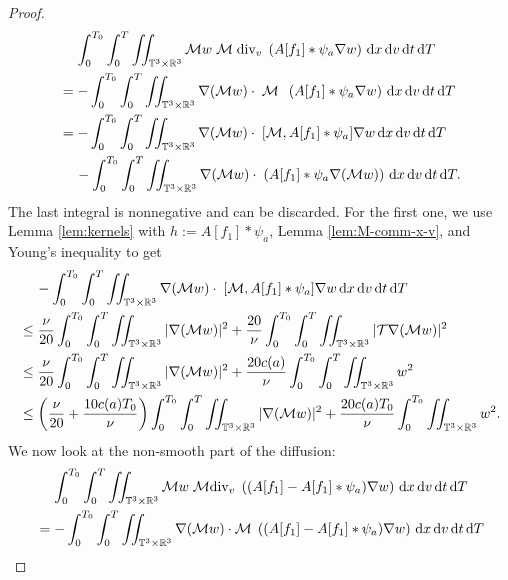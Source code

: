 \documentclass[11pt,american, reqno]{amsart}
\numberwithin{equation}{section}
\newcommand{\R}{\mathbb R}
\newcommand{\1}{\mathds{1}}
\newcommand{\dt}{\, {\rm d} t}
\newcommand{\dT}{\, {\rm d} T}
\newcommand{\dv}{\, {\rm d} v}
\newcommand{\dx}{\, {\rm d} x}
\newcommand{\T}{\mathbb{T}}
\numberwithin{equation}{section}
\begin{document}
\begin{proof}
\begin{align*}
& \quad \,
\int_0^{T_0}\int_0^{T} \iint_{\T^3 \times \R^3} \mathcal{M} w \; \mathcal{M} \; \textrm{div}_v \;\left( A[f_1]\ast \psi_a \nabla w \right)\dx\dv\dt\dT 
\\
&= -\int_0^{T_0}\int_0^{T} \iint_{\T^3 \times \R^3}  \nabla(\mathcal{M} w) \cdot  \; \mathcal{M} \; \;\left( A[f_1]\ast \psi_a \nabla w \right) \dx\dv\dt\dT 
\\
&= -\int_0^{T_0}\int_0^{T} \iint_{\T^3 \times \R^3}  \nabla(\mathcal{M} w) \cdot  \; [\mathcal{M}, A[f_1]\ast \psi_a] \nabla w \dx\dv\dt\dT
\\
& \quad \,
 -\int_0^{T_0}\int_0^{T} \iint_{\T^3 \times \R^3}  \nabla(\mathcal{M} w) \cdot  \; \left( A[f_1]\ast \psi_a \nabla (\mathcal{M}w) \right) \dx\dv\dt\dT.
\end{align*}
The last integral is nonnegative and can be discarded. For the first one, we use  Lemma \ref{lem:kernels} with $h:= A[f_1]\ast \psi_a$, Lemma \ref{lem:M-comm-x-v}, and Young's inequality to get 
\begin{align*}
& \quad \,
-\int_0^{T_0}\int_0^{T} \iint_{\T^3 \times \R^3}  \nabla(\mathcal{M} w) \cdot  \; [\mathcal{M}, A[f_1]\ast \psi_a] \nabla w \dx\dv\dt\dT 
\\
& \leq 
\frac{\nu}{20}\int_0^{T_0}\int_0^{T} \iint_{\T^3 \times \R^3}  |\nabla(\mathcal{M} w)|^2 %
+ \frac{20}{\nu}\int_0^{T_0}\int_0^{T} \iint_{\T^3 \times \R^3} |\mathcal{T} \nabla  (\mathcal{M}w )|^2 
\\
& \leq 
\frac{\nu}{20}\int_0^{T_0}\int_0^{T} \iint_{\T^3 \times \R^3}  
|\nabla(\mathcal{M} w)|^2 %
+ \frac{20 c(a) }{\nu}\int_0^{T_0}\int_0^{T} \iint_{\T^3 \times \R^3} w^2 
\\
&\le \left( \frac{\nu}{20} +  \frac{10 c(a)T_0 }{\nu}\right)  \int_0^{T_0}\int_0^{T} \iint_{\T^3 \times \R^3}  
|\nabla(\mathcal{M} w)|^2 %
+ \frac{20 c(a) T_0}{\nu}\int_0^{T_0}\iint_{\T^3 \times \R^3} 
w^2.
\end{align*}
We now look at the non-smooth part of the diffusion: 
\begin{align*}
& \quad \,
\int_0^{T_0}\int_0^{T} \iint_{\T^3 \times \R^3} 
\mathcal{M} w \; \mathcal{M}\textrm{div}_v \;\left( (A[f_1]-A[f_1]\ast \psi_a) \nabla w \right)\dx\dv\dt\dT
\\
&= - \int_0^{T_0}\int_0^{T} \iint_{\T^3 \times \R^3}  \nabla (\mathcal{M} w) \cdot \mathcal{M} \;\left( (A[f_1]-A[f_1]\ast \psi_a) \nabla w \right)\dx\dv\dt\dT

\end{align*}
\end{proof}
\end{document}
